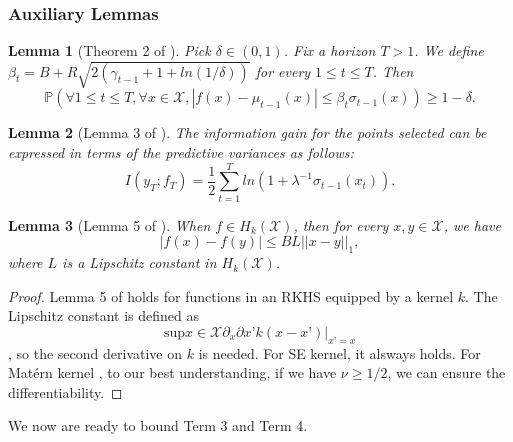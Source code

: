 \documentclass[twoside]{article}
\newtheorem{lemma}{Lemma}
\begin{document}
\subsubsection{Auxiliary Lemmas}
\sloppy
\begin{lemma}[Theorem 2 of \citep{Chowdhury17}]
Pick $\delta \in (0,1)$. Fix a horizon $T > 1$. We define $\beta_t = B + R\sqrt{2(\gamma_{t-1} + 1 + ln(1/\delta))}$ for every $1 \le t \le T$. Then
$$\mathbb{P}(\forall 1 \le t \le T, \forall x \in \mathcal X, |f(x) - \mu_{t-1}(x)| \le \beta_t \sigma_{t-1}(x) ) \ge 1 - \delta.$$
\label{le_beta_2}
\end{lemma}
\begin{lemma} [Lemma 3 of \citep{Chowdhury17}]
The information gain for the points selected can be expressed in terms of the predictive variances as follows:
$$I(y_T;f_T) = \frac{1}{2}\sum_{t=1}^{T} ln(1 + \lambda^{-1} \sigma_{t-1}(x_t)).$$
\label{lem_information_gain}
\end{lemma}
\begin{lemma}[Lemma 5 of \citep{Freitas12}]
When $f \in H_{k}(\mathcal X)$, then for every $x, y \in \mathcal X$, we have
$$|f(x) - f(y)| \le BL||x -y||_1,$$
where $L$ is a Lipschitz constant in $H_k(\mathcal X)$. \label{dimester}
\end{lemma}
\begin{proof}
Lemma 5 of \citep{Freitas12} holds for functions in an RKHS equipped by a kernel $k$. The Lipschitz constant is defined as $$\text{sup}{x \in \mathcal X} \partial_x \partial{x’} k(x-x’)|_{x’=x}$$, so the second derivative on $k$ is needed. For SE kernel, it alsways holds. For Mat\'ern kernel , to our best understanding, if we have $\nu \ge 1/2$, we can ensure the differentiability.
\end{proof}
We now are ready to bound Term 3 and Term 4.
\end{document}
